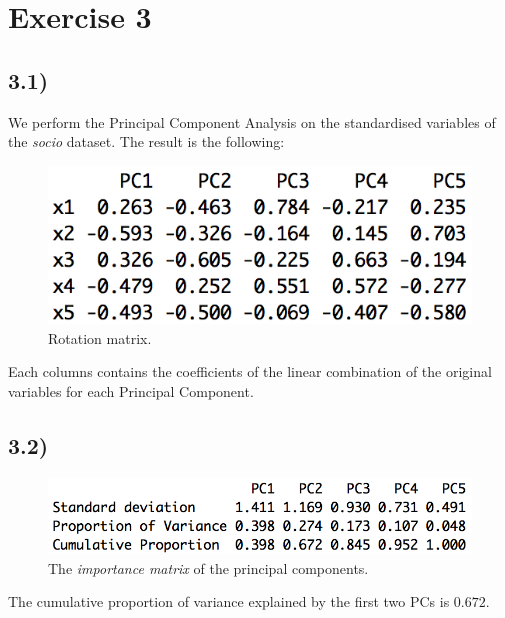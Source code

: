\documentclass[a4paper,11pt,oneside]{report}
\begin{document}
\section*{Exercise 3}
\subsection*{3.1)}
	We perform the Principal Component Analysis on the standardised variables of the \textit{socio} dataset. The result is the following:
	\begin{figure}[H]
	\centering
	\includegraphics[scale = 0.8]{PCA_socio.png}
	\caption{Rotation matrix.}
	\label{fig:rot}
	\end{figure}
	Each columns contains the coefficients of the linear combination of the original variables for each Principal Component.

\subsection*{3.2)}
	\begin{figure}[H]
	\centering
	\includegraphics[scale = 0.8]{importance_pca.png}
	\caption{The \textit{importance matrix} of the principal components.}
	\end{figure}
	The cumulative proportion of variance explained by the first two PCs is $0.672$.
\end{document}
